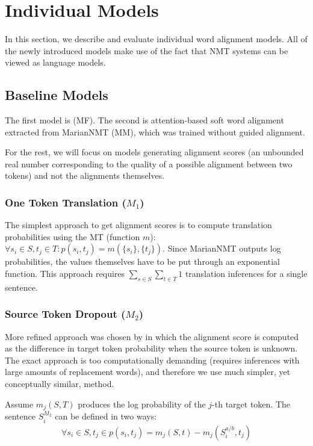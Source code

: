 \section{Individual Models} \label{sec:individual}

In this section, we describe and evaluate individual word alignment models. All of the newly introduced models make use of the fact that NMT systems can be viewed as language models. 


\subsection{Baseline Models} \label{subsec:baseline_models}

The first model is \fastalign{} (MF). The second is attention-based soft word alignment extracted from MarianNMT (MM), which was trained without guided alignment.

For the rest, we will focus on models generating alignment scores (an unbounded real number corresponding to the quality of a possible alignment between two tokens) and not the alignments themselves.

\subsubsection*{One Token Translation ($M_1$)}

The simplest approach to get alignment scores is to compute translation probabilities using the MT (function $m$): $\forall s_i\in S, t_j \in T: p(s_i, t_j) = m(\{s_i\}, \{t_j\})$. Since MarianNMT outputs log probabilities, the values themselves have to be put through an exponential function. This approach requires $\sum_{s\in S} \sum_{t\in T} 1$ translation inferences for a single sentence.

\subsubsection*{Source Token Dropout ($M_2$)}

More refined approach was chosen by \citet{zintgraf2017visualizing} in which the alignment score is computed as the difference in target token probability when the source token is unknown. The exact approach is too computationally demanding (requires inferences with large amounts of replacement words), and therefore we use much simpler, yet conceptually similar, method.

Assume $m_j(S, T)$ produces the log probability of the $j$-th target token. The sentence $S^{M_2}_i$ can be defined in two ways:
\begin{gather*}
    \forall s_i \in S, t_j \in p(s_i, t_j) = m_j(S, t) - m_j(S^{a/b}_i , t_j)
\end{gather*}

